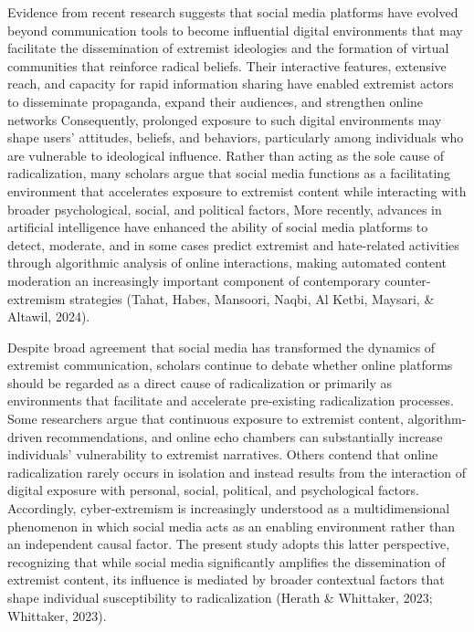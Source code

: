 \documentclass[10pt]{NSP1}
\begin{document}
Evidence from recent research suggests that social media platforms have evolved beyond communication tools to become influential digital environments that may facilitate the dissemination of extremist ideologies and the formation of virtual communities that reinforce radical beliefs. Their interactive features, extensive reach, and capacity for rapid information sharing have enabled extremist actors to disseminate propaganda, expand their audiences, and strengthen online networks Consequently, prolonged exposure to such digital environments may shape users' attitudes, beliefs, and behaviors, particularly among individuals who are vulnerable to ideological influence. Rather than acting as the sole cause of radicalization, many scholars argue that social media functions as a facilitating environment that accelerates exposure to extremist content while interacting with broader psychological, social, and political factors, More recently, advances in artificial intelligence have enhanced the ability of social media platforms to detect, moderate, and in some cases predict extremist and hate-related activities through algorithmic analysis of online interactions, making automated content moderation an increasingly important component of contemporary counter-extremism strategies (Tahat, Habes, Mansoori, Naqbi, Al Ketbi, Maysari, \& Altawil, 2024).

Despite broad agreement that social media has transformed the dynamics of extremist communication, scholars continue to debate whether online platforms should be regarded as a direct cause of radicalization or primarily as environments that facilitate and accelerate pre-existing radicalization processes. Some researchers argue that continuous exposure to extremist content, algorithm-driven recommendations, and online echo chambers can substantially increase individuals' vulnerability to extremist narratives. Others contend that online radicalization rarely occurs in isolation and instead results from the interaction of digital exposure with personal, social, political, and psychological factors. Accordingly, cyber-extremism is increasingly understood as a multidimensional phenomenon in which social media acts as an enabling environment rather than an independent causal factor. The present study adopts this latter perspective, recognizing that while social media significantly amplifies the dissemination of extremist content, its influence is mediated by broader contextual factors that shape individual susceptibility to radicalization (Herath \& Whittaker, 2023; Whittaker, 2023).
\end{document}
